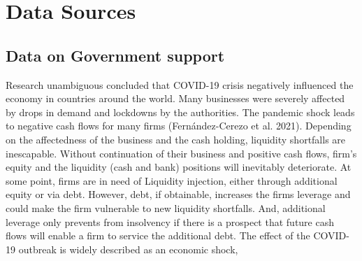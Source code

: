 
\chapter{Data Sources} %

\label{ChapterX} %


\section{Data on Government support}

Research unambiguous concluded that COVID-19 crisis negatively influenced the economy in countries around the world. Many businesses were severely affected by drops in demand and lockdowns by the authorities. The pandemic shock leads to negative cash flows for many firms (Fernández-Cerezo et al. 2021). Depending on the affectedness of the business and the cash holding, liquidity shortfalls are inescapable. 
Without continuation of their business and positive cash flows, firm’s equity and the liquidity (cash and bank) positions will inevitably deteriorate. At some point, firms are in need of Liquidity injection, either through additional equity or via debt. However, debt, if obtainable, increases the firms leverage and could make the firm vulnerable to new liquidity shortfalls. And, additional leverage only prevents from insolvency if there is a prospect that future cash flows will enable a firm to service the additional debt.
The effect of the COVID-19 outbreak is widely described as an economic shock,

